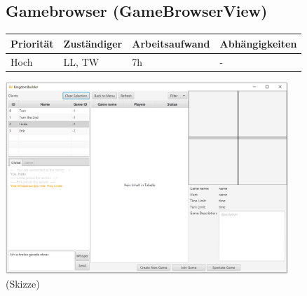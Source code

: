 \documentclass[a4paper]{scrreprt}
\newenvironment{requirement}[5] {
	\subsection{#1}
	\begin{tabularx}{\textwidth}{|X|l|X|X|}
		\hline
		Priorität & Zuständiger & Arbeitsaufwand & Abhängigkeiten \\
		\hline
		#2 & #3 & #4 & #5 \\
		\hline
	\end{tabularx}
	}{
	\newpage
	}
\begin{document}
\begin{requirement}{Gamebrowser (GameBrowserView)}{Hoch}{LL, TW}{7h}{-}
\begin{center}
	\includegraphics[width=0.8\textwidth]{view3.png}
	\\
	\tiny{(Skizze)}
\end{center}

\end{requirement}
\end{document}
